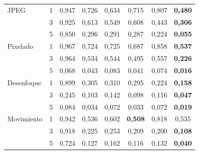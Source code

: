 \begin{table}
\begin{tabular*}{\linewidth}{@{\extracolsep{\fill}}llcccccc}
\addlinespace[2pt]
JPEG & 1 & 0{,}947 & 0{,}726 & 0{,}634 & 0{,}715 & 0{,}807 & \textbf{0{,}480} \\
 & 3 & 0{,}925 & 0{,}613 & 0{,}549 & 0{,}608 & 0{,}443 & \textbf{0{,}306} \\
 & 5 & 0{,}850 & 0{,}296 & 0{,}291 & 0{,}287 & 0{,}224 & \textbf{0{,}055} \\
\addlinespace[2pt]
Pixelado & 1 & 0{,}967 & 0{,}724 & 0{,}725 & 0{,}687 & 0{,}858 & \textbf{0{,}537} \\
 & 3 & 0{,}964 & 0{,}534 & 0{,}544 & 0{,}495 & 0{,}557 & \textbf{0{,}226} \\
 & 5 & 0{,}068 & 0{,}043 & 0{,}083 & 0{,}041 & 0{,}074 & \textbf{0{,}016} \\
\addlinespace[2pt]
Desenfoque & 1 & 0{,}899 & 0{,}305 & 0{,}310 & 0{,}295 & 0{,}224 & \textbf{0{,}158} \\
 & 3 & 0{,}245 & 0{,}103 & 0{,}142 & 0{,}098 & 0{,}116 & \textbf{0{,}047} \\
 & 5 & 0{,}084 & 0{,}034 & 0{,}072 & 0{,}033 & 0{,}072 & \textbf{0{,}019} \\
\addlinespace[2pt]
Movimiento & 1 & 0{,}942 & 0{,}536 & 0{,}602 & \textbf{0{,}508} & 0{,}818 & 0{,}535 \\
 & 3 & 0{,}918 & 0{,}225 & 0{,}253 & 0{,}209 & 0{,}200 & \textbf{0{,}108} \\
 & 5 & 0{,}724 & 0{,}127 & 0{,}162 & 0{,}116 & 0{,}132 & \textbf{0{,}040} \\
\bottomrule
\end{tabular*}
\end{table}
